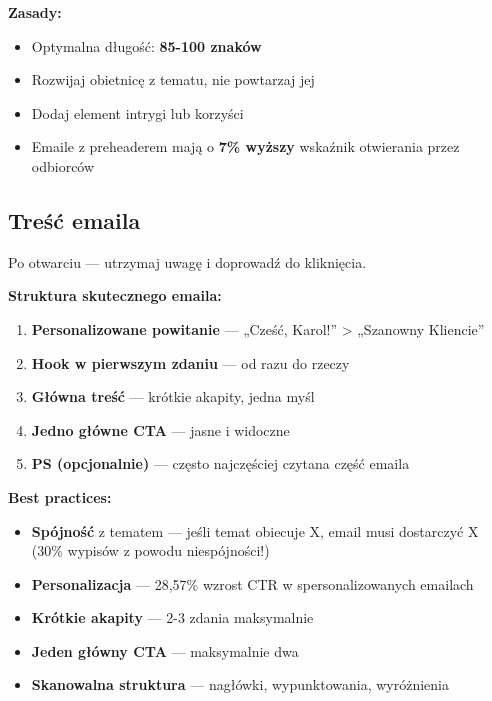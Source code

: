 \documentclass[
  12pt,
  a4paper,
  twoside,
  openright,
  12pt,
  DIV=12,
  BCOR=12mm]{scrbook}
\providecommand{\tightlist}{%
  \setlength{\itemsep}{0pt}\setlength{\parskip}{0pt}}\usepackage{longtable,booktabs,array}
\begin{document}
\textbf{Zasady:}

\begin{itemize}
\tightlist
\item
  Optymalna długość: \textbf{85-100 znaków}
\item
  Rozwijaj obietnicę z tematu, nie powtarzaj jej
\item
  Dodaj element intrygi lub korzyści
\item
  Emaile z preheaderem mają o \textbf{7\% wyższy} wskaźnik otwierania
  przez odbiorców
\end{itemize}

\subsection{Treść emaila}\label{treux15bux107-emaila}

Po otwarciu --- utrzymaj uwagę i doprowadź do kliknięcia.

\textbf{Struktura skutecznego emaila:}

\begin{enumerate}
\def\labelenumi{\arabic{enumi}.}
\tightlist
\item
  \textbf{Personalizowane powitanie} --- „Cześć, Karol!'' \textgreater{}
  „Szanowny Kliencie''
\item
  \textbf{Hook w pierwszym zdaniu} --- od razu do rzeczy
\item
  \textbf{Główna treść} --- krótkie akapity, jedna myśl
\item
  \textbf{Jedno główne CTA} --- jasne i widoczne
\item
  \textbf{PS (opcjonalnie)} --- często najczęściej czytana część emaila
\end{enumerate}

\textbf{Best practices:}

\begin{itemize}
\tightlist
\item
  \textbf{Spójność} z tematem --- jeśli temat obiecuje X, email musi
  dostarczyć X (30\% wypisów z powodu niespójności!)
\item
  \textbf{Personalizacja} --- 28,57\% wzrost CTR w spersonalizowanych
  emailach
\item
  \textbf{Krótkie akapity} --- 2-3 zdania maksymalnie
\item
  \textbf{Jeden główny CTA} --- maksymalnie dwa
\item
  \textbf{Skanowalna struktura} --- nagłówki, wypunktowania, wyróżnienia
\end{itemize}
\end{document}
